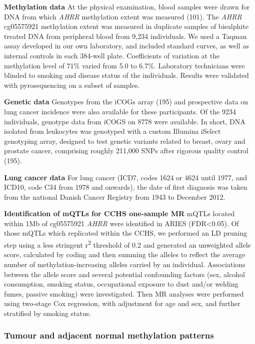 \documentclass[11pt,oneside]{bristolthesis}
\begin{document}
\textbf{Methylation data}
At the physical examination, blood samples were drawn for DNA from which \emph{AHRR} methylation extent was measured (101). The \emph{AHRR} cg05575921 methylation extent was measured in duplicate samples of bisulphite treated DNA from peripheral blood from 9,234 individuals. We used a Taqman assay developed in our own laboratory, and included standard curves, as well as internal controls in each 384-well plate. Coefficients of variation at the methylation level of 71\% varied from 5.0 to 6.7\%. Laboratory technicians were blinded to smoking and disease status of the individuals. Results were validated with pyrosequencing on a subset of samples.

\textbf{Genetic data}
Genotypes from the iCOGs array (195) and prospective data on lung cancer incidence were also available for these participants. Of the 9234 individuals, genotype data from iCOGS on 8778 were available. In short, DNA isolated from leukocytes was genotyped with a custom Illumina iSelect genotyping array, designed to test genetic variants related to breast, ovary and prostate cancer, comprising roughly 211,000 SNPs after rigorous quality control (195).

\textbf{Lung cancer data}
For lung cancer (ICD7, codes 1624 or 4624 until 1977, and ICD10, code C34 from 1978 and onwards), the date of first diagnosis was taken from the national Danish Cancer Registry from 1943 to December 2012.

\textbf{Identification of mQTLs for CCHS one-sample MR}
mQTLs located within 1Mb of cg05575921 \emph{AHRR} were identified in ARIES (FDR\textless0.05). Of those mQTLs which replicated within the CCHS, we performed an LD pruning step using a less stringent r\textsuperscript{2} threshold of 0.2 and generated an unweighted allele score, calculated by coding and then summing the alleles to reflect the average number of methylation-increasing alleles carried by an individual. Associations between the allele score and several potential confounding factors (sex, alcohol consumption, smoking status, occupational exposure to dust and/or welding fumes, passive smoking) were investigated. Then MR analyses were performed using two-stage Cox regression, with adjustment for age and sex, and further stratified by smoking status.

\hypertarget{tumour-and-adjacent-normal-methylation-patterns}{%
\subsubsection{Tumour and adjacent normal methylation patterns}\label{tumour-and-adjacent-normal-methylation-patterns}}
\end{document}
